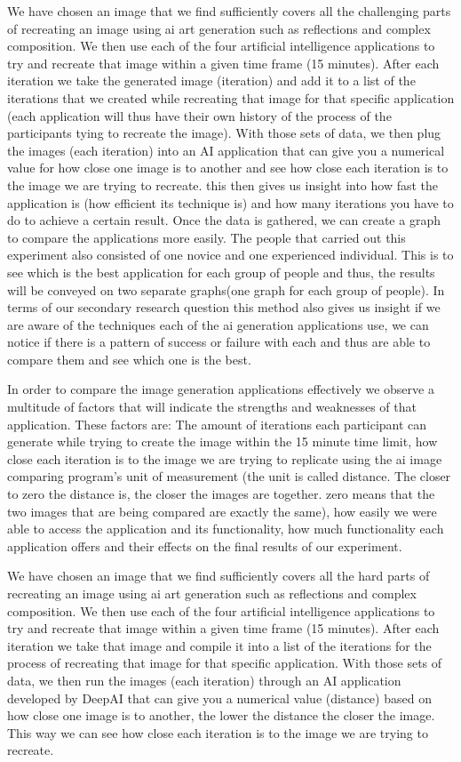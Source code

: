 \documentclass[]{report}
\begin{document}
	We have chosen an image that we find sufficiently covers all the challenging parts of recreating an image using ai art generation such as reflections and complex composition. We then use each of the four artificial intelligence applications to try and recreate that image within a given time frame (15 minutes). After each iteration we take the generated image (iteration) and add it to a list of the iterations that we created while recreating that image for that specific application (each application will thus have their own history of the process of the participants tying to recreate the image). With those sets of data, we then plug the images (each iteration) into an AI application that can give you a numerical value for how close one image is to another and see how close each iteration is to the image we are trying to recreate. this then gives us insight into how fast the application is (how efficient its technique is) and how many iterations you have to do to achieve a certain result. Once the data is gathered, we can create a graph to compare the applications more easily. The people that carried out this experiment also consisted of one novice and one experienced individual. This is to see which is the best application for each group of people and thus, the results will be conveyed on two separate graphs(one graph for each group of people). In terms of our secondary research question this method also gives us insight if we are aware of the techniques each of the ai generation applications use, we can notice if there is a pattern of success or failure with each and thus are able to compare them and see which one is the best.
	
	In order to compare the image generation applications effectively we observe a multitude of factors that will indicate the strengths and weaknesses of that application. These factors are: The amount of iterations each participant can generate while trying to create the image within the 15 minute time limit, how close each iteration is to the image we are trying to replicate using the ai image comparing program's unit of measurement (the unit is called distance. The closer to zero the distance is, the closer the images are together. zero means that the two images that are being compared are exactly the same), how easily we were able to access the application and its functionality, how much functionality each application offers and their effects on the final results of our experiment.
	
	
	We have chosen an image that we find sufficiently covers all the hard parts of recreating an image using ai art generation such as reflections and complex composition. We then use each of the four artificial intelligence applications to try and recreate that image within a given time frame (15 minutes). After each iteration we take that image and compile it into a list of the iterations for the process of recreating that image for that specific application. With those sets of data, we then run the images (each iteration) through an AI application developed by DeepAI that can give you a numerical value (distance) based on how close one image is to another, the lower the distance the closer the image. This way we can see how close each iteration is to the image we are trying to recreate.
	
\end{document}
